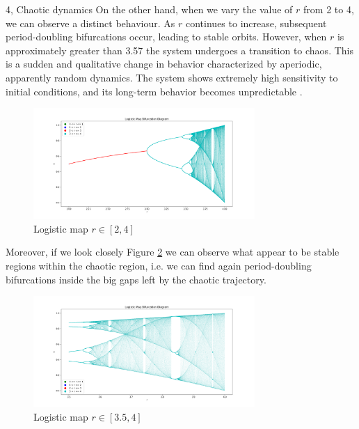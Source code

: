 \begin{task}{4, Chaotic dynamics}
On the other hand, when we vary the value of \(r\) from 2 to 4, we can observe a distinct behaviour. As \(r\) continues to increase, subsequent period-doubling bifurcations occur, leading to stable orbits. However, when \(r\) is approximately greater than 3.57 the system undergoes a transition to chaos. This is a sudden and qualitative change in behavior characterized by aperiodic, apparently random dynamics. The system shows extremely high sensitivity to initial conditions, and its long-term behavior becomes unpredictable \cite{gleick2008chaos}.

\begin{figure}[H]
    \centering
    \includegraphics[width=0.75\textwidth]{images/logistic_map_2_4.png}
    \caption{Logistic map \(r \in [2,4]\)}
    \label{r24}
\end{figure}

Moreover, if we look closely Figure \ref{r34} we can observe what appear to be stable regions within the chaotic region, i.e. we can find again period-doubling bifurcations inside the big gaps left by the chaotic trajectory.

\begin{figure}[H]
    \centering
    \includegraphics[width=0.75\textwidth]{images/logistic_map_close.png}
    \caption{Logistic map \(r \in [3.5,4]\)}
    \label{r34}
\end{figure}


\end{task}
